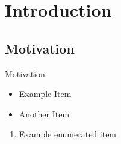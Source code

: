 \section{Introduction}

\subsection{Motivation}

\begin{frame}[fragile]{Motivation}

        \begin{itemize}
            \item Example Item
            \item Another Item
        \end{itemize}

        \begin{enumerate}
            \item Example enumerated item
        \end{enumerate}
\end{frame}
